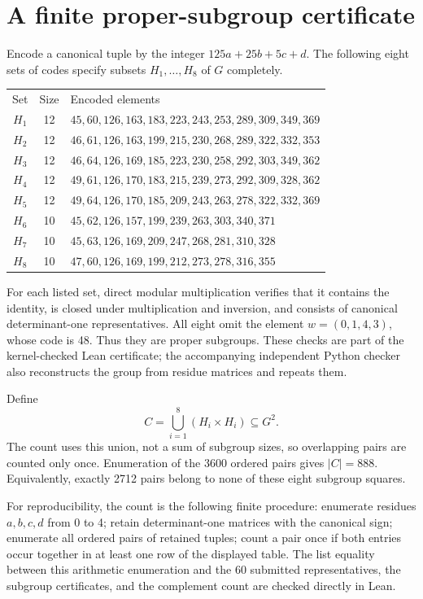 \documentclass[10pt]{article}
\begin{document}
\section{A finite proper-subgroup certificate}
Encode a canonical tuple by the integer $125a+25b+5c+d$. The following eight sets of codes specify subsets $H_1,\ldots,H_8$ of $G$ completely.
\begin{center}
\small
\begin{tabular}{ccl}
Set&Size&Encoded elements\\[3pt]
$H_1$&12&$45, 60, 126, 163, 183, 223, 243, 253, 289, 309, 349, 369$\\
$H_2$&12&$46, 61, 126, 163, 199, 215, 230, 268, 289, 322, 332, 353$\\
$H_3$&12&$46, 64, 126, 169, 185, 223, 230, 258, 292, 303, 349, 362$\\
$H_4$&12&$49, 61, 126, 170, 183, 215, 239, 273, 292, 309, 328, 362$\\
$H_5$&12&$49, 64, 126, 170, 185, 209, 243, 263, 278, 322, 332, 369$\\
$H_6$&10&$45, 62, 126, 157, 199, 239, 263, 303, 340, 371$\\
$H_7$&10&$45, 63, 126, 169, 209, 247, 268, 281, 310, 328$\\
$H_8$&10&$47, 60, 126, 169, 199, 212, 273, 278, 316, 355$\\
\end{tabular}
\end{center}
For each listed set, direct modular multiplication verifies that it contains the identity, is closed under multiplication and inversion, and consists of canonical determinant-one representatives. All eight omit the element $w=(0,1,4,3)$, whose code is 48. Thus they are proper subgroups. These checks are part of the kernel-checked Lean certificate; the accompanying independent Python checker also reconstructs the group from residue matrices and repeats them.

Define
\[
C=\bigcup_{i=1}^8(H_i\times H_i)\subseteq G^2.
\]
The count uses this union, not a sum of subgroup sizes, so overlapping pairs are counted only once. Enumeration of the 3600 ordered pairs gives $|C|=888$. Equivalently, exactly 2712 pairs belong to none of these eight subgroup squares.

For reproducibility, the count is the following finite procedure: enumerate residues $a,b,c,d$ from 0 to 4; retain determinant-one matrices with the canonical sign; enumerate all ordered pairs of retained tuples; count a pair once if both entries occur together in at least one row of the displayed table. The list equality between this arithmetic enumeration and the 60 submitted representatives, the subgroup certificates, and the complement count are checked directly in Lean.
\end{document}

